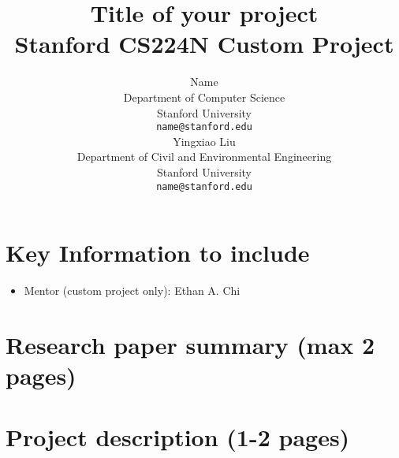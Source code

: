 \documentclass{article}
\title{
  Title of your project \\
  \vspace{1em}
  \small{\normalfont Stanford CS224N Custom Project}  %
}
\author{
  Name \\
  Department of Computer Science \\
  Stanford University \\
  \texttt{name@stanford.edu} \\
  \And
  Yingxiao Liu \\
  Department of Civil and Environmental Engineering \\
  Stanford University \\
  \texttt{name@stanford.edu} \\
}
\begin{document}
\maketitle



\section{Key Information to include}

\begin{itemize}
    \item Mentor (custom project only): Ethan A. Chi
\end{itemize}


\section{Research paper summary (max 2 pages)}

\section{Project description (1-2 pages)}




\end{document}
